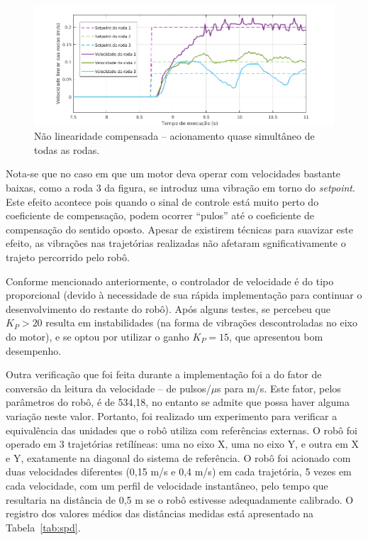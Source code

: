\begin{figure}[h!]
  \centering
  \includegraphics[width = \textwidth]{imagens/zmcomp}
  \caption{Não linearidade compensada -- acionamento quase simultâneo de todas as rodas.}
  \label{fig:zm_comp}
\end{figure}

Nota-se que no caso em que um motor deva operar com velocidades bastante baixas, como a roda 3 da figura, se introduz uma vibração em torno do \textit{setpoint}. Este efeito acontece pois quando o sinal de controle está muito perto do coeficiente de compensação, podem ocorrer ``pulos'' até o coeficiente de compensação do sentido oposto. Apesar de existirem técnicas para suavizar este efeito, as vibrações nas trajetórias realizadas não afetaram sgnificativamente o trajeto percorrido pelo robô.

Conforme mencionado anteriormente, o controlador de velocidade é do tipo proporcional (devido à necessidade de sua rápida implementação para continuar o desenvolvimento do restante do robô). Após alguns testes, se percebeu que  $K_P>20$ resulta em instabilidades (na forma de vibrações descontroladas no eixo do motor), e se optou por utilizar o ganho $K_P = 15$, que apresentou bom desempenho.


Outra verificação que foi feita durante a implementação foi a do fator de conversão da leitura da velocidade -- de pulsos/$\mu$s para m/s. Este fator, pelos parâmetros do robô, é de 534,18, no entanto se admite que possa haver alguma variação neste valor. Portanto, foi realizado um experimento para verificar a equivalência das unidades que o robô utiliza com referências externas. O robô foi operado em 3 trajetórias retílíneas: uma no eixo X, uma no eixo Y, e outra em X e Y, exatamente na diagonal do sistema de referência. O robô foi acionado com duas velocidades diferentes (0,15 m/s e 0,4 m/s) em cada trajetória, 5 vezes em cada velocidade, com um perfil de velocidade instantâneo, pelo tempo que resultaria na distância de 0,5 m se o robô estivesse adequadamente calibrado. O registro dos valores médios das distâncias medidas está apresentado na Tabela~\ref{tab:spd}.

